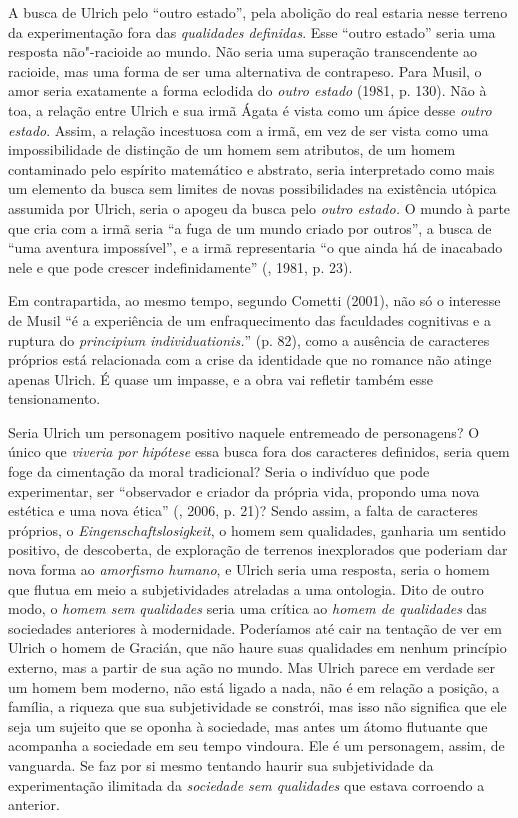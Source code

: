 A busca de Ulrich pelo ``outro estado'', pela abolição do real estaria
nesse terreno da experimentação fora das \emph{qualidades definidas}.
Esse ``outro estado'' seria uma resposta não"-racioide ao mundo. Não
seria uma superação transcendente ao racioide, mas uma forma de ser uma
alternativa de contrapeso. Para Musil, o amor seria exatamente a forma
eclodida do \emph{outro estado} (1981, p. 130). Não à toa, a
relação entre Ulrich e sua irmã Ágata é vista como um ápice desse
\emph{outro estado}. Assim, a relação incestuosa com a irmã, em vez de
ser vista como uma impossibilidade de distinção de um homem sem
atributos, de um homem contaminado pelo espírito matemático e abstrato,
seria interpretado como mais um elemento da busca sem limites de novas
possibilidades na existência utópica assumida por Ulrich, seria o apogeu
da busca pelo \emph{outro estado.} O mundo à parte que cria com a
irmã seria ``a fuga de um mundo criado por outros'', a busca de ``uma
aventura impossível'', e a irmã representaria ``o que ainda há de
inacabado nele e que pode crescer indefinidamente'' (, 1981, p. 23).

Em contrapartida, ao mesmo tempo, segundo Cometti (2001), não só o
interesse de Musil ``é a experiência de um enfraquecimento das
faculdades cognitivas e a ruptura do \emph{principium}
\emph{individuationis.}'' (p. 82), como a ausência de caracteres
próprios está relacionada com a crise da identidade que no romance não
atinge apenas Ulrich. É quase um impasse, e a obra vai refletir também
esse tensionamento.

Seria Ulrich um personagem positivo naquele entremeado de personagens? O
único que \emph{viveria por hipótese} essa busca fora dos caracteres
definidos, seria quem foge da cimentação da moral tradicional? Seria o
indivíduo que pode experimentar, ser ``observador e criador da própria
vida, propondo uma nova estética e uma nova ética'' (, 2006, p.
21)? Sendo assim, a falta de caracteres próprios, o
\emph{Eingenschaftslosigkeit}, o homem sem qualidades, ganharia um
sentido positivo, de descoberta, de exploração de terrenos inexplorados
que poderiam dar nova forma ao \emph{amorfismo humano}, e Ulrich seria
uma resposta, seria o homem que flutua em meio a subjetividades
atreladas a uma ontologia. Dito de outro modo, o \emph{homem sem
qualidades} seria uma crítica ao \emph{homem de qualidades} das
sociedades anteriores à modernidade. Poderíamos até cair na tentação de
ver em Ulrich o homem de Gracián, que não haure suas qualidades em
nenhum princípio externo, mas a partir de sua ação no mundo. Mas Ulrich
parece em verdade ser um homem bem moderno, não está ligado a nada, não
é em relação a posição, a família, a riqueza que sua subjetividade se
constrói, mas isso não significa que ele seja um sujeito que se oponha à
sociedade, mas antes um átomo flutuante que acompanha a sociedade em
seu tempo vindoura. Ele é um personagem, assim, de vanguarda.
Se faz por si mesmo tentando haurir sua subjetividade da experimentação
ilimitada da \emph{sociedade sem qualidades} que estava corroendo a
anterior.

